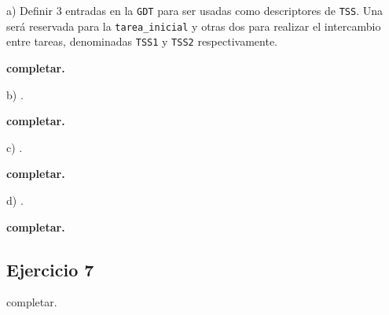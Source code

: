\vspace*{0.5cm}

\noindent
a) Definir 3 entradas en la \verb|GDT| para ser usadas como descriptores de \verb|TSS|. Una ser\'a reservada 
para la \verb|tarea_inicial| y otras dos para realizar el intercambio entre tareas, denominadas \verb|TSS1| 
y \verb|TSS2| respectivamente.

\vspace*{0.3cm}

\textbf{completar.}

\vspace*{0.5cm} \noindent



\noindent
b) .

\vspace*{0.3cm}

\textbf{completar.}

\vspace*{0.5cm} \noindent



\noindent
c) .

\vspace*{0.3cm}

\textbf{completar.}

\vspace*{0.5cm} \noindent



\noindent
d) .

\vspace*{0.3cm}

\textbf{completar.}

\vspace*{0.5cm} \noindent





\subsection*{Ejercicio 7}

\vspace*{0.3cm} \noindent

completar.

\newpage
